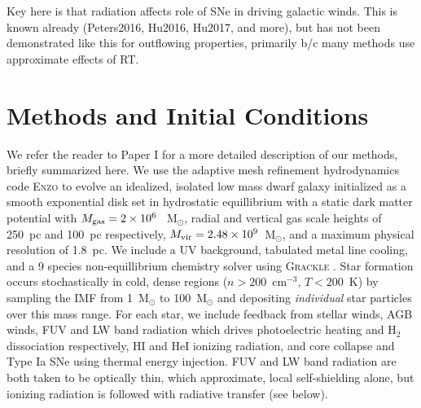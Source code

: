 \documentclass[twocolumn]{aastex62}
\begin{document}
Key here is that radiation affects role of SNe in driving galactic winds. This is known already (Peters2016, Hu2016, Hu2017, and more), but has not been demonstrated like this for outflowing properties, primarily b/c many methods use approximate effects of RT. 

\section{Methods and Initial Conditions} \label{sec:methods}
We refer the reader to Paper I for a more detailed description of our methods, briefly summarized here. We use the adaptive mesh refinement hydrodynamics code \textsc{Enzo} \citep{Enzo} to evolve an idealized, isolated low mass dwarf galaxy initialized as a smooth exponential disk set in hydrostatic equillibrium with a static dark matter potential with $M_{\rm gas} = 2 \times 10^6~$~M$_{\odot}$, radial and vertical gas scale heights of 250~pc and 100~pc respectively, $M_{\rm vir} = 2.48 \times 10^9$~M$_{\odot}$, and a maximum physical resolution of 1.8~pc. We include a UV background, tabulated metal line cooling, and a 9 species non-equillibrium chemistry solver using \textsc{Grackle} \citep{Grackle}. Star formation occurs stochastically in cold, dense regions ($n > 200$~cm$^{-3}$, $T < 200$~K) by sampling the \cite{Salpeter1995} IMF from 1~M$_{\odot}$ to 100~M$_{\odot}$ and depositing \textit{individual} star particles over this mass range. For each star, we include feedback from stellar winds, AGB winds, FUV and LW band radiation which drives photoelectric heating and H$_2$ dissociation respectively, HI and HeI ionizing radiation, and core collapse and Type Ia SNe using thermal energy injection. FUV and LW band radiation are both taken to be optically thin, which approximate, local self-shielding alone, but ionizing radiation is followed with radiative transfer (see below). 
\end{document}
